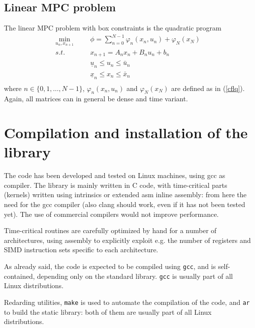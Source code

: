 \documentclass[a4paper]{report}
\begin{document}
\section{Linear MPC problem}

The linear MPC problem with box constraints is the quadratic program
\begin{equation}
\begin{aligned}
\min_{u_n,x_{n+1}} &&& \phi = \sum_{n=0}^{N-1} \varphi_n(x_n,u_n) + \varphi_N(x_N) \\
s.t. &&& x_{n+1} = A_nx_n+B_nu_n+b_n \\
&&& \underline{u}_n\leq u_n\leq\bar{u}_n \\
&&& \underline{x}_n\leq x_n\leq\bar{x}_n \\
\end{aligned}
\label{lmpc}
\end{equation}
where $n\in\{0,1,\dots,N-1\}$, $\varphi_n(x_n,u_n)$ and $\varphi_N(x_N)$ are defined as in (\ref{cflq}). Again, all matrices can in general be dense and time variant.



\chapter{Compilation and installation of the library}

The code has been developed and tested on Linux machines, using gcc as compiler.
The library is mainly written in C code, with time-critical parts (kernels) written using intrinsics or extended asm inline assembly: from here the need for the gcc compiler (also clang should work, even if it has not been tested yet).
The use of commercial compilers would not improve performance.

Time-critical routines are carefully optimized by hand for a number of architectures, using assembly to explicitly exploit e.g. the number of registers and SIMD instruction sets specific to each architecture.


As already said, the code is expected to be compiled using {\tt gcc}, and is self-contained, depending only on the standard library.
{\tt gcc} is usually part of all Linux distributions.

Redarding utilities, {\tt make} is used to automate the compilation of the code, and {\tt ar} to build the static library: both of them are usually part of all Linux distributions.
\end{document}
